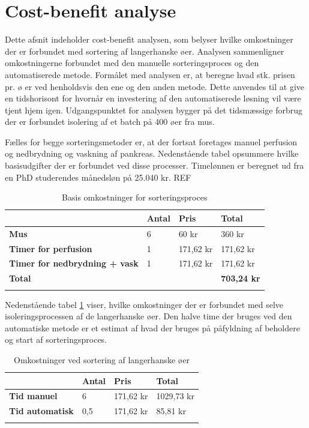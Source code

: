 \newpage
\section{Cost-benefit analyse}
Dette afsnit indeholder cost-benefit analysen, som belyser hvilke omkostninger der er forbundet med sortering af langerhanske øer. Analysen sammenligner omkostningerne forbundet med den manuelle sorteringsproces og den automatiserede metode. Formålet med analysen er, at beregne hvad stk. prisen pr. ø er ved henholdsvis den ene og den anden metode. Dette anvendes til at give en tidshorisont for hvornår en investering af den automatiserede løsning vil være tjent hjem igen. Udgangspunktet for analysen bygger på det tidsmæssige forbrug der er forbundet isolering af et batch på 400 øer fra mus. 

Fælles for begge sorteringsmetoder er, at der fortsat foretages manuel perfusion og nedbrydning og vaskning af pankreas. Nedenstående tabel opsummere hvilke basisudgifter der er forbundet ved disse processer. Timelønnen er beregnet ud fra en PhD studerendes månedsløn på 25.040 kr. REF
\begin{center}
		\begin{longtable}{ | m{6cm} | m{1.5cm} | m{1.5cm} | m{3cm}| } 
			\hline
			 &\textbf{Antal} & \textbf{Pris} & \textbf{Total}\\ 
			\hline
			 \textbf{Mus} & 6 & 60 kr & 360 kr\\ 
			\hline
			 \textbf{Timer for perfusion} & 1 & 171,62 kr & 171,62 kr\\ 
			\hline
			\textbf{Timer for nedbrydning + vask} & 1 & 171,62 kr & 171,62 kr\\ 
			\hline	
			\textbf{Total} &  &  & \textbf{703,24 kr}\\ 
			\hline
			\caption{Basis omkostninger for sorteringsproces}
			 		\end{longtable}
\end{center}
Nedenstående tabel \ref{tab:sortcost} viser, hvilke omkostninger der er forbundet med selve isoleringsprocessen af de langerhanske øer. Den halve time der bruges ved den automatiske metode er et estimat af hvad der bruges på påfyldning af beholdere og start af sorteringsproces. 
\begin{center}
		\begin{longtable}{ | m{6cm} | m{1.5cm} | m{1.5cm} | m{3cm}| } 
			\hline
			 &\textbf{Antal} & \textbf{Pris} & \textbf{Total}\\ 
			\hline
			 \textbf{Tid manuel} & 6 & 171,62 kr & 1029,73 kr\\ 
			\hline
			 \textbf{Tid automatisk} & 0,5 & 171,62 kr & 85,81 kr\\ 
			\hline
			\caption{Omkostninger ved sortering af langerhanske øer}
			\label{tab:sortcost}
			 		\end{longtable}
\end{center}
